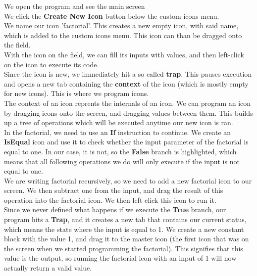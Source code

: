 \documentclass{article}
\begin{document}
        We open the program and see the main screen\\

        We click the \textbf{Create New Icon} button below the custom icons menu.\\

        We name our icon 'factorial'. This creates a new empty icon, with said name, which is added to the custom icons
        menu. This icon can than be dragged onto the field. \\

        With the icon on the field, we can fill its inputs with values, and then left-click on the icon to execute its
        code. \\

        Since the icon is new, we immediately hit a so called \textbf{trap}. This pauses execution and opens a new tab
        containing the \textbf{context} of the icon (which is mostly empty for new icons). This is where we program
        icons. \\

        The context of an icon reprents the internals of an icon. We can program an icon by dragging icons onto the
        screen, and dragging values between them. This builds up a tree of operations which will be executed anytime
        our new icon is ran.\\

        In the factorial, we need to use an \textbf{If} instruction to continue. We create an \textbf{IsEqual} icon and
        use it to check whether the input parameter of the factorial is equal to one. In our case, it is not, so the
        \textbf{False} branch is highlighted, which means that all following operations we do will only execute if the
        input is not equal to one.\\

        We are writing factorial recursively, so we need to add a new factorial icon to our screen. We then subtract
        one from the input, and drag the result of this operation into the factorial icon. We then left click this icon
        to run it.\\

        Since we never defined what happens if we execute the \textbf{True} branch, our program hits a \textbf{Trap},
        and it creates a new tab that contains our current status, which means the state where the input is equal to 1.
        We create a new constant block with the value 1, and drag it to the master icon (the first icon that was on
        the screen when we started programming the factorial). This signifies that this value is the output, so running
        the factorial icon with an input of 1 will now actually return a valid value.\\
\end{document}
